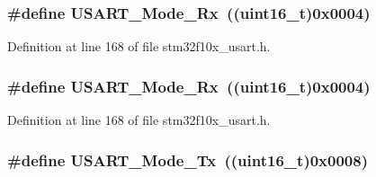 \subsubsection[{\texorpdfstring{U\+S\+A\+R\+T\+\_\+\+Mode\+\_\+\+Rx}{USART_Mode_Rx}}]{\setlength{\rightskip}{0pt plus 5cm}\#define U\+S\+A\+R\+T\+\_\+\+Mode\+\_\+\+Rx~(({\bf uint16\+\_\+t})0x0004)}\hypertarget{group___u_s_a_r_t___mode_gafefcc3d3c1a1f83b425784fa6289aecf}{}\label{group___u_s_a_r_t___mode_gafefcc3d3c1a1f83b425784fa6289aecf}


Definition at line 168 of file stm32f10x\+\_\+usart.\+h.

\subsubsection[{\texorpdfstring{U\+S\+A\+R\+T\+\_\+\+Mode\+\_\+\+Rx}{USART_Mode_Rx}}]{\setlength{\rightskip}{0pt plus 5cm}\#define U\+S\+A\+R\+T\+\_\+\+Mode\+\_\+\+Rx~(({\bf uint16\+\_\+t})0x0004)}\hypertarget{group___u_s_a_r_t___mode_gafefcc3d3c1a1f83b425784fa6289aecf}{}\label{group___u_s_a_r_t___mode_gafefcc3d3c1a1f83b425784fa6289aecf}


Definition at line 168 of file stm32f10x\+\_\+usart.\+h.

\subsubsection[{\texorpdfstring{U\+S\+A\+R\+T\+\_\+\+Mode\+\_\+\+Tx}{USART_Mode_Tx}}]{\setlength{\rightskip}{0pt plus 5cm}\#define U\+S\+A\+R\+T\+\_\+\+Mode\+\_\+\+Tx~(({\bf uint16\+\_\+t})0x0008)}\hypertarget{group___u_s_a_r_t___mode_ga22b2813509a062435ea68d086ec565b4}{}\label{group___u_s_a_r_t___mode_ga22b2813509a062435ea68d086ec565b4}


